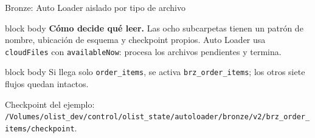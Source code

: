 \documentclass[aspectratio=169,10pt]{beamer}
\begin{document}
\begin{frame}{Bronze: Auto Loader aislado por tipo de archivo}
  \centering

  \vspace{.45em}
  \begin{beamercolorbox}[rounded=true,sep=.55em,wd=\linewidth]{block body}
    \small
    \textbf{Cómo decide qué leer.} Las ocho subcarpetas tienen un patrón de nombre,
    ubicación de esquema y checkpoint propios. Auto Loader usa \texttt{cloudFiles}
    con \texttt{availableNow}: procesa los archivos pendientes y termina.
  \end{beamercolorbox}
  \vspace{.3em}
  \begin{beamercolorbox}[rounded=true,sep=.45em,wd=\linewidth]{block body}
    \centering\small Si llega solo \texttt{order\_items}, se activa \texttt{brz\_order\_items};
    los otros siete flujos quedan intactos.
  \end{beamercolorbox}
  \vspace{.2em}
  {\centering\tiny\color{OlistGray}
  Checkpoint del ejemplo: \texttt{/Volumes/olist\_dev/control/olist\_state/autoloader/bronze/v2/brz\_order\_items/checkpoint}.\par}
\end{frame}
\end{document}
